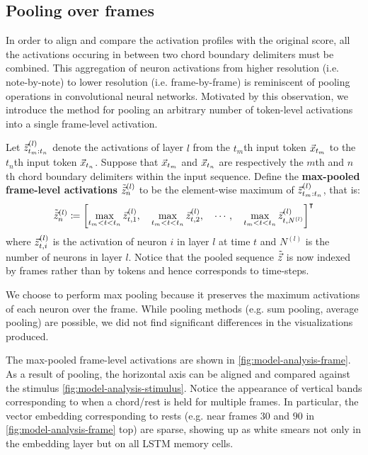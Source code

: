 \documentclass[dissertation.tex]{subfiles}
\begin{document}
\subsection{Pooling over frames}

In order to align and compare the activation profiles with the original score,
all the activations occuring in between two chord boundary delimiters must be
combined. This aggregation of neuron activations from higher resolution (i.e.
note-by-note) to lower resolution (i.e. frame-by-frame) is reminiscent of
pooling operations in convolutional neural networks. Motivated by
this observation, we introduce the method for pooling an arbitrary number of
token-level activations into a single frame-level activation.

Let $\vec{z}^{(l)}_{{t_m}:{t_n}}$ denote the activations of layer $l$ from the $t_m$th input token $\vec{x}_{t_m}$
to the $t_n$th input token $\vec{x}_{t_n}$. Suppose that $\vec{x}_{t_m}$ and $\vec{x}_{t_n}$ are respectively the
$m$th and $n$th chord boundary delimiters within the input sequence. Define the
\textbf{max-pooled frame-level activations} $\tilde{\vec{z}}^{(l)}_n$ to be the
element-wise maximum of $\vec{z}^{(l)}_{{t_m}:{t_n}}$, that is:
\begin{equation}
    \tilde{\vec{z}}^{(l)}_n \coloneqq \left[
        \max_{t_m < t < t_n} \vec{z}^{(l)}_{t,1},\quad
        \max_{t_m < t < t_n} \vec{z}^{(l)}_{t,2},\quad
        \cdots,\quad
        \max_{t_m < t < t_n} \vec{z}^{(l)}_{t,N^{(l)}}
    \right]^\intercal
\end{equation}
where $\vec{z}^{(l)}_{t,i}$ is the activation of neuron $i$ in layer $l$ at time $t$
and $N^{(l)}$ is the number of neurons in layer $l$. Notice that the pooled
sequence $\tilde{\vec{z}}$ is now indexed by frames rather than by tokens and hence
corresponds to time-steps.

We choose to perform max pooling because it preserves the maximum activations
of each neuron over the frame. While pooling methods (e.g. sum pooling, average
pooling) are possible, we did not find significant differences in the
visualizations produced.

The max-pooled frame-level activations are shown in
\autoref{fig:model-analysis-frame}. As a result of pooling, the horizontal axis
can be aligned and compared against the stimulus
\autoref{fig:model-analysis-stimulus}. Notice the appearance of vertical bands
corresponding to when a chord/rest is held for multiple frames. In particular,
the vector embedding corresponding to rests (e.g. near frames $30$ and $90$ in
\autoref{fig:model-analysis-frame} top) are sparse, showing up as white smears
not only in the embedding layer but on all LSTM memory cells.
\end{document}
